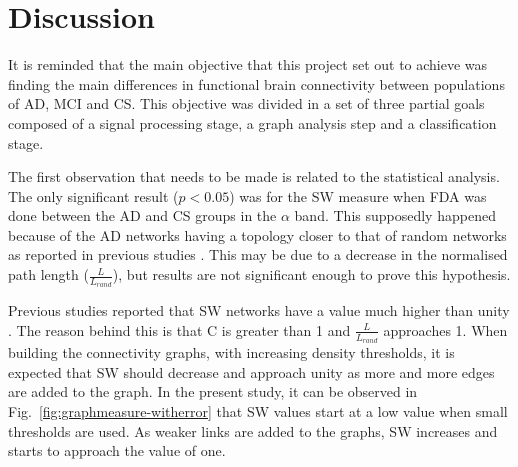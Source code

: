 \chapter{Discussion}



It is reminded that the main objective that this project set out to achieve was finding the main differences in functional brain connectivity between populations of \ac{AD}, \ac{MCI} and \ac{CS}. This objective was divided in a set of three partial goals composed of a signal processing stage, a graph analysis step and a classification stage.




The first observation that needs to be made is related to the statistical analysis. The only significant result (\(p<0.05\)) was for the \ac{SW} measure when \ac{FDA} was done between the \ac{AD} and \ac{CS} groups in the \(\alpha\) band. This supposedly happened because of the \ac{AD} networks having a topology closer to that of random networks as reported in previous studies \autocite{Stam2007a,Lo2010,Zhao2012}. This may be due to a decrease in the normalised path length (\( \frac{L}{L_{rand}} \)), but results are not significant enough to prove this hypothesis. 


Previous studies reported that \ac{SW} networks have a value much higher than unity \autocite{Rubinov2010}. The reason behind this is that {C} is greater than 1 and \( \frac{L}{L_{rand}} \) approaches 1. When building the connectivity graphs, with increasing density thresholds, it is expected that \ac{SW} should decrease and approach unity as more and more edges are added to the graph. In the present study, it can be observed in Fig.~\ref{fig:graphmeasure-witherror} that \ac{SW} values start at a low value when small thresholds are used. As weaker links are added to the graphs, \ac{SW} increases and starts to approach the value of one. 

